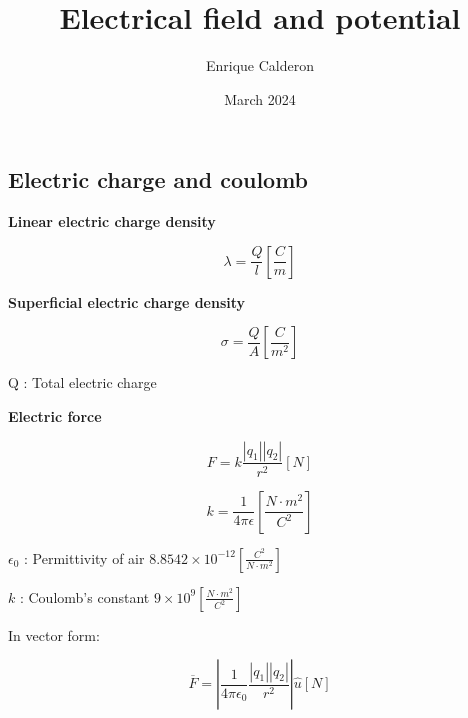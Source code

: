 \documentclass[letterpaper]{article}
\title{Electrical field and potential}
\author{Enrique Calderon}
\date{March 2024}
\begin{document}
    \begin{multicols}{3}
        \section{Electric charge and coulomb}
        
        \textbf{Linear electric charge density}
        
        \[\lambda = \frac{Q}{l} \left[\frac{C}{m}\right]\]

        \textbf{Superficial electric charge density}

        \[\sigma = \frac{Q}{A} \left[\frac{C}{m^{2}}\right]\]

        Q : Total electric charge
        
        \textbf{Electric force}

        \[F = k \frac{|q_{1}||q_{2}|}{r^{2}}[N]\]

        \[k = \frac{1}{4 \pi \epsilon} \left[\frac{N \cdot m^{2}}{C^{2}}\right] \]

        \(\epsilon_{0}\) : Permittivity of air \( 8.8542 \times 10^{-12} \left[\frac{C^{2}}{N \cdot m^{2}}\right] \)

        \(k\) : Coulomb's constant \(9 \times 10^{9} \left[\frac{N \cdot m^{2}}{C^{2}}\right] \)

        In vector form:

         \[\overline{F} = \left| \frac{1}{4 \pi \epsilon_{0}} \frac{|q_{1}||q_{2}|}{r^{2}} \right| \hat{u}  [N]\]
        
    \end{multicols}
\end{document}

